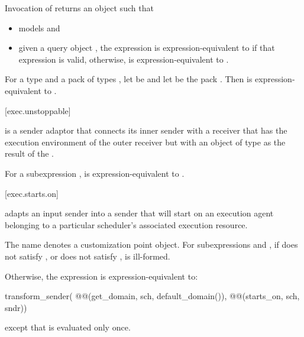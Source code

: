\pnum
Invocation of
returns an object  such that
\begin{itemize}
\item
{} models  and
\item
given a query object ,
the expression  is expression-equivalent
to  if that expression is valid,
otherwise,  is expression-equivalent
to .
\end{itemize}

\pnum
For a type  and a pack of types ,
let  be  and
let  be the pack
.
Then 
is expression-equivalent to
.

[exec.unstoppable]{}

\pnum
{} is a sender adaptor
that connects its inner sender
with a receiver that has the execution environment of the outer receiver
but with an object of type 
as the result of the .

\pnum
For a subexpression ,
 is expression-equivalent to
.

[exec.starts.on]{}

\pnum
{} adapts an input sender into a sender
that will start on an execution agent belonging to
a particular scheduler's associated execution resource.

\pnum
The name  denotes a customization point object.
For subexpressions  and ,
if  does not satisfy , or
 does not satisfy ,
 is ill-formed.

\pnum
Otherwise,
the expression  is expression-equivalent to:
\begin{codeblock}
transform_sender(
  @@(get_domain, sch, default_domain()),
  @@(starts_on, sch, sndr))
\end{codeblock}
except that  is evaluated only once.

